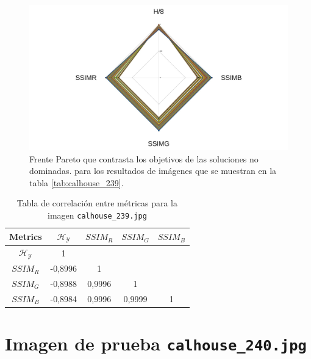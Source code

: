    \begin{figure}[H]
    \centering
    \includegraphics[width=\textwidth]{./Figures/calhouse_239/calhouse_239_2.jpg}
    \caption{Frente Pareto que contrasta los objetivos de las soluciones no dominadas. para los resultados de imágenes que se muestran en la tabla \ref{tab:calhouse_239}.}
    \label{fig:calhouse2392fp}
    \end{figure}

\begin{table}[H]
\setlength{\abovecaptionskip}{2pt plus 3pt minus 2pt} %
\caption[Parámetros de entrada para $MOPSO$]{Tabla de correlación entre métricas para la imagen \texttt{calhouse\_239.jpg}}
\begin{center}
 \begin{tabular}{||c | c c c c||} 
 \hline
Metrics & $\mathscr{H_Y}$ & $SSIM_R$ & $SSIM_G$ & $SSIM_B$ \\ 
\hline
$\mathscr{H_Y}$ & 1 &  &  & \\ 
\hline
$SSIM_R$ & -0,8996 & 1 &  \\ 
\hline
$SSIM_G$ & -0,8988 & 0,9996  & 1  & \\ 
\hline
$SSIM_B$ & -0,8984 & 0,9996  & 0,9999  & 1 \\ 
\hline
\end{tabular}
\end{center}
\label{table:correlacion}
\end{table}


\section{Imagen de prueba \texttt{calhouse\_240.jpg}}

